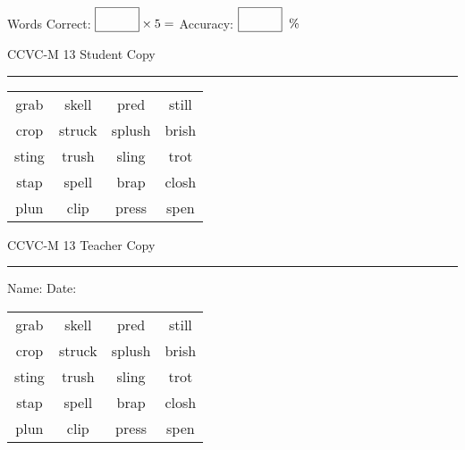 \documentclass{memoir}
\begin{document}
\small

Words Correct: $\fbox{\phantom{\huge 100}} \times 5 = $ Accuracy: $\fbox{\phantom{\huge 100}}\;\; \%$ 

\vfill

\newpage


\footnotesize \noindent
CCVC-M 13 \hfill Student Copy
\smallskip
\hrule

\Large

\setlength{\tabcolsep}{14pt}
\def\arraystretch{3}

{\selectfont


\begin{vplace}[0.5]
\begin{center}
\begin{tabular}{cccc}
grab                    & skell & pred & still \\
crop & struck & splush & brish \\
sting & trush & sling & trot \\
stap & spell & brap               & closh            \\
plun & clip & press       & spen \\
\end{tabular}
\end{center}
\end{vplace}

}

\newpage

\footnotesize \noindent
CCVC-M 13 \hfill Teacher Copy
\smallskip
\hrule

\small

\vfill

\noindent
Name: \underline{\hspace{1.75in}} \hfill Date: \underline{\hspace{1in}}

\Large

{\selectfont


\begin{vplace}[0.5]
\begin{center}
\begin{tabular}{cccc}
grab                    & skell & pred & still \\
crop & struck & splush & brish \\
sting & trush & sling & trot \\
stap & spell & brap               & closh            \\
plun & clip & press       & spen \\
\end{tabular}
\end{center}
\end{vplace}



}
\end{document}
